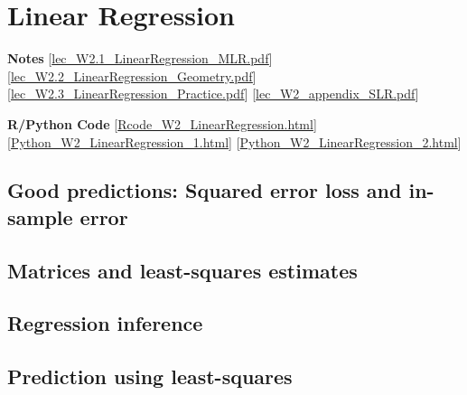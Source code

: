 \documentclass[
]{book}
\begin{document}
\hypertarget{linear-regression}{%
\chapter{Linear Regression}\label{linear-regression}}

\textbf{Notes}
{[}\href{https://liangfgithub.github.io/Notes/lec_W2.1_LinearRegression_MLR.pdf}{lec\_W2.1\_LinearRegression\_MLR.pdf}{]}
{[}\href{https://liangfgithub.github.io/Notes/lec_W2.2_LinearRegression_Geometry.pdf}{lec\_W2.2\_LinearRegression\_Geometry.pdf}{]}
{[}\href{https://liangfgithub.github.io/Notes/lec_W2.3_LinearRegression_Practice.pdf}{lec\_W2.3\_LinearRegression\_Practice.pdf}{]}
{[}\href{https://liangfgithub.github.io/Notes/lec_W2_appendix_SLR.pdf}{lec\_W2\_appendix\_SLR.pdf}{]}

\textbf{R/Python Code}
{[}\href{https://liangfgithub.github.io/Rcode_W2_LinearRegression.html}{Rcode\_W2\_LinearRegression.html}{]}
{[}\href{https://liangfgithub.github.io/Python_W2_LinearRegression_1.html}{Python\_W2\_LinearRegression\_1.html}{]}
{[}\href{https://liangfgithub.github.io/Python_W2_LinearRegression_2.html}{Python\_W2\_LinearRegression\_2.html}{]}

\hypertarget{good-predictions-squared-error-loss-and-in-sample-error}{%
\section{Good predictions: Squared error loss and in-sample error}\label{good-predictions-squared-error-loss-and-in-sample-error}}

\hypertarget{matrices-and-least-squares-estimates}{%
\section{Matrices and least-squares estimates}\label{matrices-and-least-squares-estimates}}

\hypertarget{regression-inference}{%
\section{Regression inference}\label{regression-inference}}

\hypertarget{prediction-using-least-squares}{%
\section{Prediction using least-squares}\label{prediction-using-least-squares}}
\end{document}
